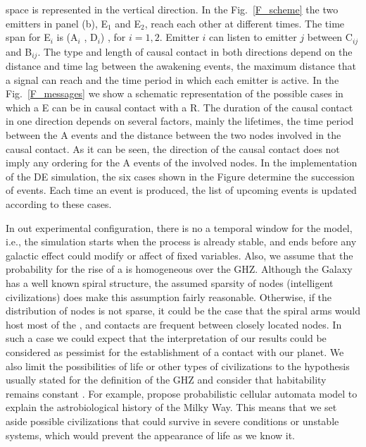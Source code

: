 space is represented in the vertical direction.
%
In the Fig.~\ref{F_scheme} the two
emitters in panel (b), E$_1$ and E$_2$, reach each other at different times.
%
The time span for E$_i$ is (A$_i$ , D$_i$) , for $i = {1, 2}$.
%
Emitter $i$ can listen to emitter $j$ between C$_{ij}$ and B$_{ij}$.
%
The type and length of causal contact in both directions depend on the
distance and time lag between the awakening events, the maximum
distance that a signal can reach and the time period in which each
emitter is active.
%
%
In the Fig.~\ref{F_messages} we show a schematic representation of the
possible cases in which a \ceti{} E can be in causal contact with a
\ceti{} R.
%
The duration of the causal contact in one direction depends on several
factors, mainly the lifetimes, the time period between the A events
and the distance between the two nodes involved in the causal
contact.
%
As it can be seen, the direction of the causal contact does not imply
any ordering for the A events of the involved nodes.
%
In the implementation of the DE simulation, the six cases shown in the
Figure determine the succession of events.
%
Each time an event is produced, the list of upcoming events is updated
according to these cases.




 


In out experimental configuration, there is no a temporal window for
the model, i.e., the simulation starts when the process is already
stable, and ends before any galactic effect could modify or affect of
fixed variables.
%
Also, we assume that the probability for the rise of a \ceti{} is
homogeneous over the GHZ.
%
Although the Galaxy has a well known spiral structure, the assumed
sparsity of nodes (intelligent civilizations) does make this
assumption fairly reasonable.
%
Otherwise, if the distribution of nodes is not sparse, it could be the
case that the spiral arms would host most of the \cetis{}, and
contacts are frequent between closely located nodes.
%
In such a case we could expect that the interpretation of our results
could be considered as pessimist for the establishment of a contact
with our planet.
%
We also limit the possibilities of life or other types of
civilizations to the hypothesis usually stated for the definition of
the GHZ \citep{dayal_habitability_2016, gonzalez_galactic_2001,
lineweaver_galactic_2004, gonzalez_habitable_2005,
morrison_extending_2015, haqq-misra_evolution_2019,
rahvar_cosmic_2016, gobat_evolution_2016, rahvar_cosmic_2016} and
consider that habitability remains constant \citep[see, however,
][]{dayal_habitability_2016, gobat_evolution_2016}.
%
For example, \citet{vukotic_astrobiological_2012} propose
probabilistic cellular automata model to explain the astrobiological
history of the Milky Way.
%
This means that we set aside possible civilizations that could survive
in severe conditions or unstable systems, which would prevent the
appearance of life as we know it.


